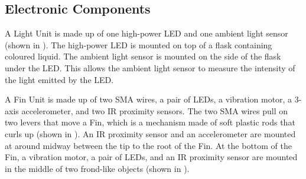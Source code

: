 \subsection{Electronic Components}

A Light Unit is made up of one high-power LED and one ambient light sensor (shown in ). The high-power LED is mounted on top of a flask containing coloured liquid. The ambient light sensor is mounted on the side of the flask under the LED. This allows the ambient light sensor to measure the intensity of the light emitted by the LED. 

A Fin Unit is made up of two SMA wires, a pair of LEDs, a vibration motor, a 3-axis accelerometer, and two IR proximity sensors. The two SMA wires pull on two levers that move a Fin, which is a mechanism made of soft plastic rods that curls up (shown in ). An IR proximity sensor and an accelerometer are mounted at around midway between the tip to the root of the Fin. At the bottom of the Fin, a vibration motor, a pair of LEDs, and an IR proximity sensor are mounted in the middle of two frond-like objects (shown in ). 

